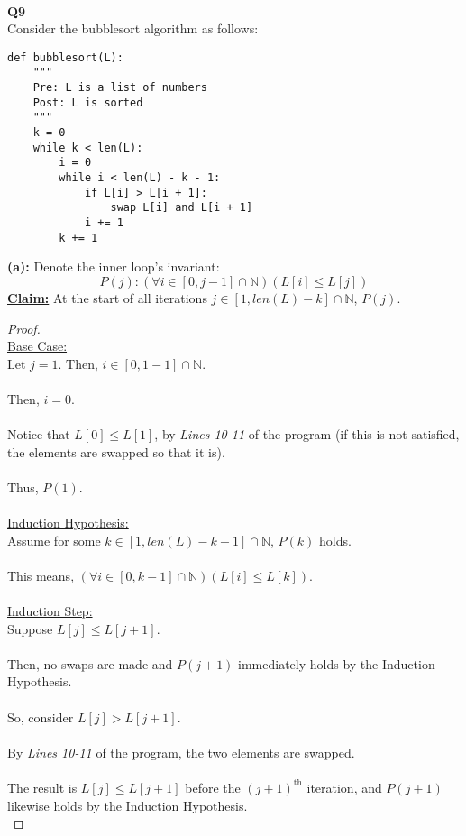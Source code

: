 \documentclass[12pt]{article}
\begin{document}
\leavevmode\\
\textbf{Q9} \\
Consider the bubblesort algorithm as follows:
\begin{lstlisting}
def bubblesort(L):
    """
    Pre: L is a list of numbers
    Post: L is sorted
    """
    k = 0
    while k < len(L):
        i = 0
        while i < len(L) - k - 1:
            if L[i] > L[i + 1]:
                swap L[i] and L[i + 1]
            i += 1
        k += 1
\end{lstlisting}
\textbf{(a):} Denote the inner loop's invariant:
\[P(j): (\forall i \in [0, j - 1] \cap \mathbb{N})(L[i] \leq L[j])\]
\textbf{\underline{Claim:}} At the start of all iterations $j \in [1, len(L) - k] \cap \mathbb{N}$, $P(j)$.
\begin{proof}
\leavevmode\\
    \underline{Base Case:} \\
    Let $j = 1$. Then, $i \in [0, 1 - 1] \cap \mathbb{N}$. \\
    \\
    Then, $i = 0$. \\
    \\
    Notice that $L[0] \leq L[1]$, by \textit{Lines 10-11} of the program (if this is not satisfied, the elements are swapped so that it is). \\
    \\
    Thus, $P(1)$. \\
    \\
    \underline{Induction Hypothesis:} \\
    Assume for some $k \in [1, len(L) - k - 1] \cap \mathbb{N}$, $P(k)$ holds. \\
    \\
    This means, $(\forall i \in [0, k - 1] \cap \mathbb{N})(L[i] \leq L[k])$. \\
    \\
    \underline{Induction Step:} \\
    Suppose $L[j] \leq L[j + 1]$. \\
    \\
    Then, no swaps are made and $P(j + 1)$ immediately holds by the Induction Hypothesis. \\
    \\
    So, consider $L[j] > L[j + 1]$. \\
    \\
    By \textit{Lines 10-11} of the program, the two elements are swapped. \\
    \\
    The result is $L[j] \leq L[j + 1]$ before the $(j + 1)^{\text{th}}$ iteration, and $P(j + 1)$ likewise holds by the Induction Hypothesis. \\
\end{proof}
\end{document}
